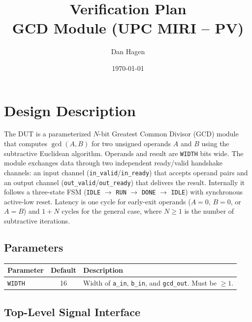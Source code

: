 \documentclass[11pt,a4paper]{article}
\title{Verification Plan \\ \large GCD Module (UPC MIRI -- PV)}
\author{Dan Hagen}
\date{\today}
\begin{document}
\maketitle
\tableofcontents
\newpage

\section{Design Description}

The DUT is a parameterized $N$-bit Greatest Common Divisor (GCD) module that computes
$\gcd(A,B)$ for two unsigned operands $A$ and $B$ using the subtractive Euclidean
algorithm. Operands and result are \texttt{WIDTH} bits wide. The module exchanges data
through two independent ready/valid handshake channels: an input channel
(\texttt{in\_valid}/\texttt{in\_ready}) that accepts operand pairs and an output channel
(\texttt{out\_valid}/\texttt{out\_ready}) that delivers the result. Internally it follows
a three-state FSM (\texttt{IDLE} $\rightarrow$ \texttt{RUN} $\rightarrow$ \texttt{DONE}
$\rightarrow$ \texttt{IDLE}) with synchronous active-low reset. Latency is one cycle for
early-exit operands ($A=0$, $B=0$, or $A=B$) and $1+N$ cycles for the general case, where
$N \geq 1$ is the number of subtractive iterations.


\subsection*{Parameters}

\begin{table}[H]
\centering
\begin{tabular}{lcp{8cm}}
\toprule
Parameter & Default & Description \\
\midrule
\texttt{WIDTH} & 16 & Width of \texttt{a\_in}, \texttt{b\_in}, and \texttt{gcd\_out}. Must be $\geq 1$. \\
\bottomrule
\end{tabular}
\end{table}

\subsection*{Top-Level Signal Interface}
\end{document}
